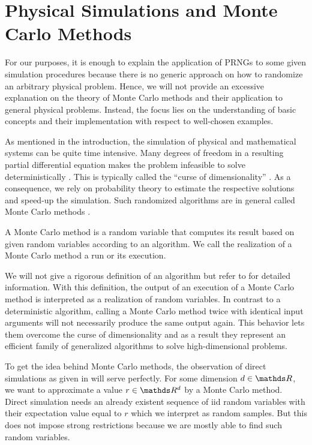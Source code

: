 \documentclass{stdlocal}
\begin{document}
\section{Physical Simulations and Monte Carlo Methods} %
\label{sub:simulation_in_physics_and_mathematics}
  For our purposes, it is enough to explain the application of PRNGs to some given simulation procedures because there is no generic approach on how to randomize an arbitrary physical problem.
  Hence, we will not provide an excessive explanation on the theory of Monte Carlo methods and their application to general physical problems.
  Instead, the focus lies on the understanding of basic concepts and their implementation with respect to well-chosen examples.

  As mentioned in the introduction, the simulation of physical and mathematical systems can be quite time intensive.
  Many degrees of freedom in a resulting partial differential equation makes the problem infeasible to solve deterministically \autocite{landau2014}.
  This is typically called the \enquote{curse of dimensionality} \autocite{mueller2012}.
  As a consequence, we rely on probability theory to estimate the respective solutions and speed-up the simulation.
  Such randomized algorithms are in general called Monte Carlo methods \autocite{mueller2012,landau2014}.

  \begin{definition}[Monte Carlo Method]
    A Monte Carlo method is a random variable that computes its result based on given random variables according to an algorithm.
    We call the realization of a Monte Carlo method a run or its execution.
  \end{definition}
  We will not give a rigorous definition of an algorithm but refer to \textcite{hromkovic2011} for detailed information.
  With this definition, the output of an execution of a Monte Carlo method is interpreted as a realization of random variables.
  In contrast to a deterministic algorithm, calling a Monte Carlo method twice with identical input arguments will not necessarily produce the same output again.
  This behavior lets them overcome the curse of dimensionality and as a result they represent an efficient family of generalized algorithms to solve high-dimensional problems.

  To get the idea behind Monte Carlo methods, the observation of direct simulations as given in \textcite{mueller2012} will serve perfectly.
  For some dimension $d\in\setReal$, we want to approximate a value $r\in\setReal^d$ by a Monte Carlo method.
  Direct simulation needs an already existent sequence of iid random variables with their expectation value equal to $r$ which we interpret as random samples.
  But this does not impose strong restrictions because we are mostly able to find such random variables.
\end{document}
